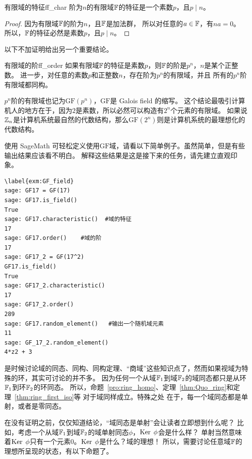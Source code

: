 \begin{proposition}{有限域的特征}{ff_char}
阶为$n$的有限域${\mathbb F}$的特征是一个素数$p$，且$p\mid n$。
\end{proposition}

\begin{proof}
因为有限域${\mathbb F}$的阶为$n$，且${\mathbb F}$是加法群，
所以对任意的$a\in {\mathbb F}$，有$na = 0$。
所以，${\mathbb F}$的特征必然是素数$p$，且$p \mid n$。
\end{proof}

以下不加证明给出另一个重要结论。
\begin{proposition}{有限域的阶}{ff_order}
如果有限域${\mathbb F}$的特征是素数$p$，则${\mathbb F}$的阶是$p^n$，$n$是某个正整数。
进一步，对任意的素数$p$和正整数$n$，存在阶为$p^n$的有限域，并且
所有的$p^n$阶有限域都同构。
\end{proposition}

$p^n$阶的有限域也记为$\mathrm{GF}(p^n)$，$\mathrm{GF}$是 Galois field 的缩写。
这个结论最吸引计算机人的地方在于，因为$2$是素数，所以必然可以构造有$2^n$个元素的有限域。
如果说${\mathbb Z}_n$是计算机系统最自然的代数结构，那么$\mathrm{GF}(2^n)$则是计算机系统的最理想化的代数结构。
\begin{example}
使用 SageMath 可轻松定义使用$\mathrm{GF}$域，请看以下简单例子。虽然简单，但是有些输出结果应该看不明白。
解释这些结果是这是接下来的任务，请先建立直观印象。
\begin{lstlisting}
\label{exm:GF_field}
sage: GF17 = GF(17)
sage: GF17.is_field()
True
sage: GF17.characteristic()  #域的特征
17
sage: GF17.order()    #域的阶
17
sage: GF17_2 = GF(17^2)
GF17.is_field()
True
sage: GF17_2.characteristic()
17
sage: GF17_2.order()
289
sage: GF17.random_element()   #输出一个随机域元素
11
sage: GF_17_2.random_element()
4*z2 + 3
\end{lstlisting}
\end{example}

是时候讨论域的同态、同构、同构定理、“商域”这些知识点了，然而如果视域为特殊的环，其实可讨论的并不多。
因为任何一个从域${\mathbb F}_1$到域${\mathbb F}_2$的域同态都只是从环${\mathbb F}_1$到环${\mathbb F}_2$的环同态。
所以，命题~\ref{pro:ring_homo}、定理~\ref{thm:Quo_ring}和定理~\ref{thm:ring_first_iso}等
对于域同样成立。特殊之处
在于，每一个域同态都是单射，或者是零同态。

在没有证明之前，仅仅知道结论，“域同态是单射”会让读者立即想到什么呢？
比如，考虑一个从域${\mathbb F}_1$到域${\mathbb F}_2$的域单射同态$\phi$，$\operatorname{Ker}\; \phi$会是什么样？
单射当然意味着$\operatorname{Ker}\; \phi$只有一个元素$0$。$\operatorname{Ker}\; \phi$是什么？域的理想！
所以，需要讨论任意域${\mathbb F}$的理想所呈现的状态，有以下命题了。

